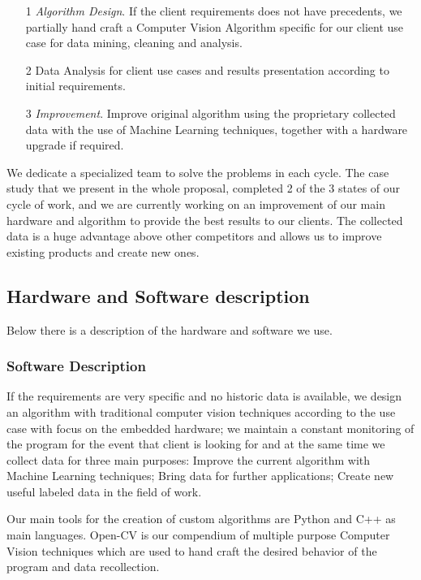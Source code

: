 \begin{itemize}

\item[1] \textit{Algorithm Design}. If the client requirements does not have precedents, we partially hand craft a Computer Vision Algorithm specific for our client use case for data mining, cleaning and analysis.
\item[2] Data Analysis for client use cases and results presentation according to initial requirements.
\item[3] \textit{Improvement}. Improve original algorithm using the proprietary collected data with the use of Machine Learning techniques, together with a hardware upgrade if required.
     
\end{itemize}

We dedicate a specialized team to solve the problems in each cycle. The case study that we present in the whole proposal, completed 2 of the 3 states of our cycle of work, and we are currently working on an improvement of our main hardware and algorithm to provide the best results to our clients. The collected data is a huge advantage above other competitors and allows us to improve existing products and create new ones.

\subsection{Hardware and Software description}
Below there is a description of the hardware and software we use.

\subsubsection{Software Description}
If the requirements are very specific and no historic data is available, we design an algorithm with traditional computer vision techniques according to the use case with focus on the embedded hardware; we maintain a constant monitoring of the program for the event that client is looking for and at the same time we collect data for three main purposes: Improve the current algorithm with Machine Learning techniques; Bring data for further applications; Create new useful labeled data in the field of work.

Our main tools for the creation of custom algorithms are Python and C++ as main languages. Open-CV is our compendium of multiple purpose Computer Vision techniques which are used to hand craft the desired behavior of the program and data recollection.

